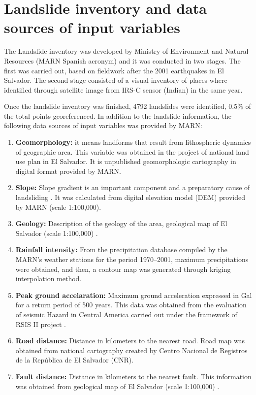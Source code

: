 \documentclass[11pt,twoside]{rmta2010esp}%
\begin{document}
\section{Landslide inventory and data sources of input variables}
\label{sec:landsinvet}
The Landslide inventory was developed by Ministry of Environment and Natural Resources (MARN Spanish acronym) and it was conducted in two stages. The first was carried out, based on fieldwork after the 2001 earthquakes in El Salvador. The second stage consisted of a visual inventory of places where identified through satellite image from IRS-C sensor (Indian) in the same year.


Once the landslide inventory was finished, 4792 landslides were identified, 0.5\% of the total points georeferenced. In addition to the landslide information, the following data sources of input variables was provided by MARN: 


\begin{enumerate}
\item {\bf Geomorphology:} it means landforms that result from lithospheric dynamics of geographic area. This variable was obtained in the project of national land use plan in El Salvador. It is unpublished geomorphologic cartography in digital format provided by MARN.


\item {\bf Slope:} Slope gradient is an important component and a
preparatory cause of landsliding \cite{garcia2008}. It was calculated from digital elevation model (DEM) provided by MARN (scale 1:100,000). 

\item {\bf Geology:} Description of the geology of the area, geological map of  El Salvador (scale 1:100,000) \cite{weber}.

\item {\bf Rainfall intensity:} From the precipitation database compiled by the
MARN's weather stations for the period 1970–2001, maximum precipitations were obtained, 
and then, a contour map was generated through kriging interpolation method.

\item {\bf Peak ground accelaration:} Maximum ground acceleration expressed in Gal for a return period of 500 years. This data was obtained from the evaluation of seismic Hazard in Central America carried out under the framework of RSIS II project \cite{beni2012}.

\item {\bf Road distance:} Distance in kilometers to the nearest road. Road map was obtained from national cartography created by Centro Nacional de Registros de la Rep\'{u}blica de El Salvador (CNR).

\item {\bf Fault distance:} Distance in kilometers to the nearest fault. This information was obtained from geological map of El Salvador (scale 1:100,000) \cite{weber}.
 
\end{enumerate}
\end{document}
